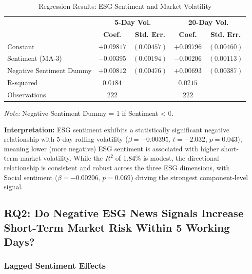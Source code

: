 \documentclass[12pt,a4paper]{article}
\begin{document}
\begin{table}[H]
    \centering
    \caption{Regression Results: ESG Sentiment and Market Volatility}
    \label{tab:reg-volatility}
    \begin{tabular}{lcccc}
        \toprule
        & \multicolumn{2}{c}{\textbf{5-Day Vol.}} & \multicolumn{2}{c}{\textbf{20-Day Vol.}} \\
        & \textbf{Coef.} & \textbf{Std. Err.} & \textbf{Coef.} & \textbf{Std. Err.} \\
        \midrule
        Constant & $+0.09817$ & $(0.00457)$ & $+0.09796$ & $(0.00460)$ \\
        Sentiment (MA-3) & $-0.00395$ & $(0.00194)$ & $-0.00206$ & $(0.00113)$ \\
        Negative Sentiment Dummy & $+0.00812$ & $(0.00476)$ & $+0.00693$ & $(0.00387)$ \\
        \midrule
        R-squared & $0.0184$ & & $0.0215$ & \\
        Observations & $222$ & & $222$ & \\
        \bottomrule
    \end{tabular}
    \vspace{0.3cm}
    
    \small{\textit{Note:} Negative Sentiment Dummy = 1 if Sentiment < 0.}
\end{table}

\textbf{Interpretation:} ESG sentiment exhibits a statistically significant negative relationship with 5-day rolling volatility ($\beta = -0.00395$, $t = -2.032$, $p = 0.043$), meaning lower (more negative) ESG sentiment is associated with higher short-term market volatility. While the $R^2$ of 1.84\% is modest, the directional relationship is consistent and robust across the three ESG dimensions, with Social sentiment ($\beta = -0.00206$, $p = 0.069$) driving the strongest component-level signal.

\subsection{RQ2: Do Negative ESG News Signals Increase Short-Term Market Risk Within 5 Working Days?}
\label{subsec:rq2}

\subsubsection{Lagged Sentiment Effects}
\label{subsubsec:lagged-effects}
\end{document}
